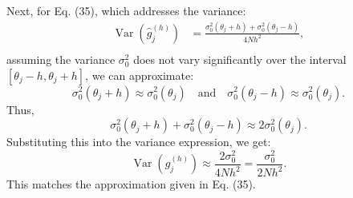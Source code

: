 Next, for Eq. (35), which addresses the variance:
\begin{align}
    \operatorname{Var}\left(\hat{g}_j^{(h)}\right) 
    & = \frac{\sigma_0^2(\theta_j + h) + \sigma_0^2(\theta_j - h)}{4 N h^2}, \\
\end{align}
assuming the variance $\sigma_0^2$ does not vary significantly over the interval $[\theta_j - h, \theta_j + h]$, we can approximate:
\begin{equation}
    \sigma_0^2(\theta_j + h) \approx \sigma_0^2(\theta_j) \quad \text{and} \quad \sigma_0^2(\theta_j - h) \approx \sigma_0^2(\theta_j).
\end{equation}
Thus,
\begin{equation}
    \sigma_0^2(\theta_j + h) + \sigma_0^2(\theta_j - h) \approx 2 \sigma_0^2(\theta_j).
\end{equation}
Substituting this into the variance expression, we get:
\begin{equation}
    \operatorname{Var}\left(\hat{g}_j^{(h)}\right) \approx \frac{2 \sigma_0^2}{4 N h^2} = \frac{\sigma_0^2}{2 N h^2}.
\end{equation}
This matches the approximation given in Eq. (35).

